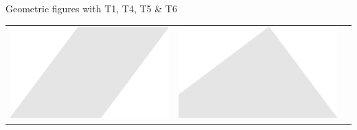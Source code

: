 \documentclass[14pt]{beamer}
\begin{document}
\begin{frame}{Geometric figures with T1, T4, T5 \& T6}
\begin{center}
\begin{tabular}{ccc}
                \;\;\includegraphics[scale=0.3]{figures/figure023g.pdf} \;\;&
                \;\;\includegraphics[scale=0.3]{figures/figure023i.pdf} \\
            \end{tabular}
        \end{center}
    \end{frame}

\end{document}
